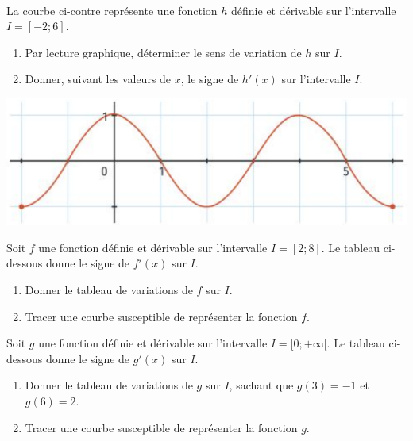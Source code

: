 \documentclass[11pt]{article}
\begin{document}
\begin{exo}~\\[2mm]
\begin{minipage}{.6\textwidth}
  La courbe ci-contre représente une fonction $h$ définie et dérivable sur
  l'intervalle $I=[-2;6]$.
  \begin{enumerate}
    \item Par lecture graphique, déterminer le sens de variation de $h$ sur $I$.
    \item Donner, suivant les valeurs de $x$, le signe de $h'(x)$ sur
      l'intervalle $I$.
  \end{enumerate}
\end{minipage}
\begin{minipage}{.4\textwidth}
  \begin{center}
    \includegraphics[scale=.25]{exo3.png}
  \end{center}
\end{minipage}
\end{exo}

\begin{exo}
Soit $f$ une fonction définie et dérivable sur
l'intervalle $I=[2;8]$. Le tableau ci-dessous donne le signe de $f'(x)$ sur $I$.
\begin{center}
\end{center}
\begin{enumerate}
  \item Donner le tableau de variations de $f$ sur $I$.
  \item Tracer une courbe susceptible de représenter la fonction $f$.
\end{enumerate}
\end{exo}

\begin{exo}
Soit $g$ une fonction définie et dérivable sur
l'intervalle $I=[0;+\infty[$. Le tableau ci-dessous donne le signe de $g'(x)$ sur $I$.
\begin{center}
\end{center}
\begin{enumerate}
  \item Donner le tableau de variations de $g$ sur $I$, sachant que $g(3)=-1$ et
    $g(6)=2$.
  \item Tracer une courbe susceptible de représenter la fonction $g$.
\end{enumerate}
\end{exo}
\end{document}

